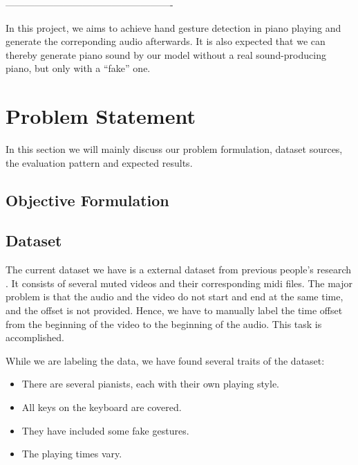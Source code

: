 \documentclass[10pt,twocolumn,letterpaper]{article}
\begin{document}
----------------------------------------------------


In this project, we aims to achieve hand gesture detection in piano playing and generate the correponding audio afterwards.
It is also expected that we can thereby generate piano sound by our model without a real sound-producing piano, but only with a ``fake'' one.

\section{Problem Statement}
In this section we will mainly discuss our problem formulation, dataset sources, the evaluation pattern and expected results.

    \subsection{Objective Formulation}

    \subsection{Dataset}
    The current dataset we have is a external dataset from previous people’s research \cite{Akbari}.
    It consists of several muted videos and their corresponding midi files.
    The major problem is that the audio and the video do not start and end at the same time, and the offset is not provided.
    Hence, we have to manually label the time offset from the beginning of the video to the beginning of the audio.
    This task is accomplished.

    While we are labeling the data, we have found several traits of the dataset:
    \begin{itemize}
        \item There are several pianists, each with their own playing style.
        \item All keys on the keyboard are covered.
        \item They have included some fake gestures.
        \item The playing times vary.
    \end{itemize}
\end{document}
